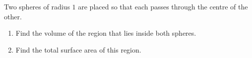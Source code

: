 Two spheres of radius $1$ are placed so that each passes through the centre of the other.
\begin{enumerate}
\item[(a)] Find the volume of the region that lies inside both spheres.
\item[(b)] Find the total surface area of this region.
\end{enumerate}

